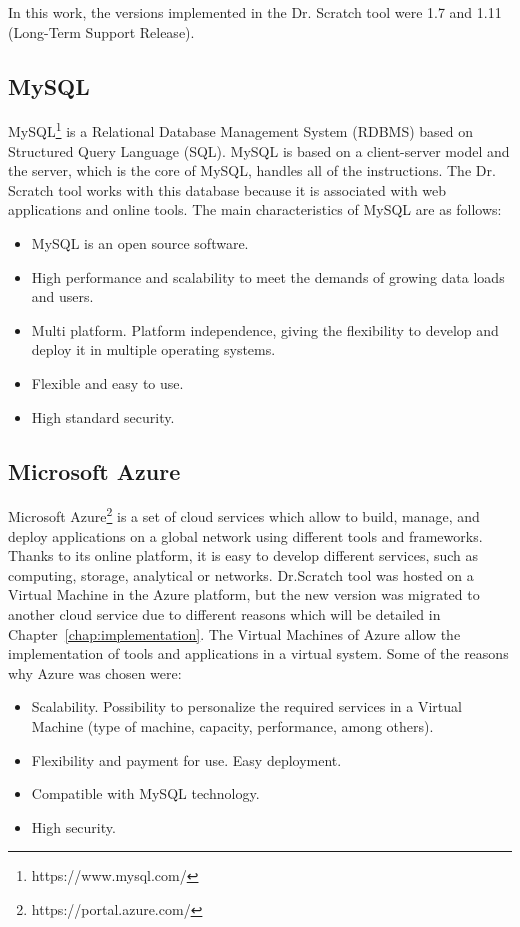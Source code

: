 In this work, the versions implemented in the Dr. Scratch tool were 1.7 and 1.11 (Long-Term Support Release).


\subsection{MySQL}
\label{subsec:mysql}

MySQL\footnote{https://www.mysql.com/} is a Relational Database Management System (RDBMS) based on Structured Query Language (SQL). MySQL is based on a client-server model and the server, which is the core of MySQL, handles all of the instructions. The Dr. Scratch tool works with this database because it is associated with web applications and online tools. The main characteristics of MySQL are as follows:


\begin{itemize}
  \item MySQL is an open source software.
  \item High performance and scalability to meet the demands of growing data loads and users.
  \item Multi platform. Platform independence, giving the flexibility to develop and deploy it in multiple operating systems.
  \item Flexible and easy to use.
  \item High standard security.
\end{itemize}  

 

\subsection{Microsoft Azure}
\label{subsec:azure}

Microsoft Azure\footnote{https://portal.azure.com/} is a set of cloud services which allow to build, manage, and deploy applications on a global network using different tools and frameworks. Thanks to its online platform, it is easy to develop different services, such as computing, storage, analytical or networks. Dr.Scratch tool was hosted on a Virtual Machine in the Azure platform, but the new version was migrated to another cloud service due to different reasons which will be detailed in Chapter~\ref{chap:implementation}. The Virtual Machines of Azure allow the implementation of tools and applications in a virtual system. Some of the reasons why Azure was chosen were:

\begin{itemize}
    \item Scalability. Possibility to personalize the required services in a Virtual Machine (type of machine, capacity, performance, among others).
    \item Flexibility and payment for use. Easy deployment.
    \item Compatible with MySQL technology.
    \item High security.
\end{itemize}


